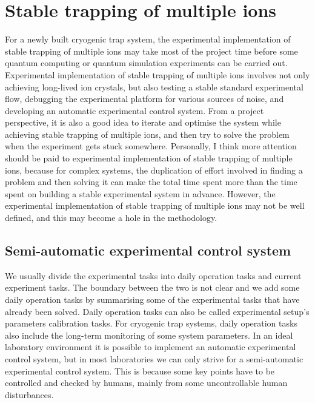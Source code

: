 
\chapter{Stable trapping of multiple ions}

For a newly built cryogenic trap system, the experimental implementation of stable trapping of multiple ions may take most of the project time before some quantum computing or quantum simulation experiments can be carried out. Experimental implementation of stable trapping of multiple ions involves not only achieving long-lived ion crystals, but also testing a stable standard experimental flow, debugging the experimental platform for various sources of noise, and developing an automatic experimental control system. From a project perspective, it is also a good idea to iterate and optimise the system while achieving stable trapping of multiple ions, and then try to solve the problem when the experiment gets stuck somewhere. Personally, I think more attention should be paid to experimental implementation of stable trapping of multiple ions, because for complex systems, the duplication of effort involved in finding a problem and then solving it can make the total time spent more than the time spent on building a stable experimental system in advance. However, the experimental implementation of stable trapping of multiple ions may not be well defined, and this may become a hole in the methodology.



\section{Semi-automatic experimental control system}

We usually divide the experimental tasks into daily operation tasks and current experiment tasks. The boundary between the two is not clear and we add some daily operation tasks by summarising some of the experimental tasks that have already been solved. Daily operation tasks can also be called experimental setup's parameters calibration tasks. For cryogenic trap systems, daily operation tasks also include the long-term monitoring of some system parameters. In an ideal laboratory environment it is possible to implement an automatic experimental control system, but in most laboratories we can only strive for a semi-automatic experimental control system. This is because some key points have to be controlled and checked by humans, mainly from some uncontrollable human disturbances.

